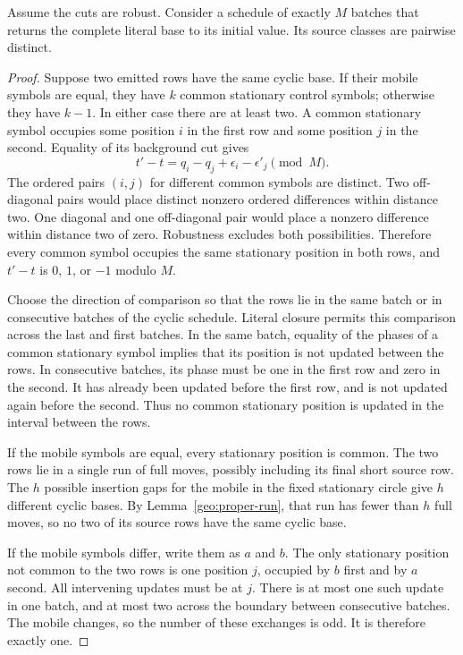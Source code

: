 \begin{lemma}
\label{geo:simplicity}
Assume the cuts are robust. Consider a schedule of exactly $M$ batches
that returns the complete literal base to its initial value. Its source
classes are pairwise distinct.
\end{lemma}
\begin{proof}
Suppose two emitted rows have the same cyclic base. If their mobile
symbols are equal, they have $k$ common stationary control symbols;
otherwise they have $k-1$. In either case there are at least two. A common
stationary symbol occupies some position $i$ in the first row and some
position $j$ in the second. Equality of its background cut gives
\[
 t'-t=q_i-q_j+\epsilon_i-\epsilon'_j\pmod M.
\]
The ordered pairs $(i,j)$ for different common symbols are distinct. Two
off-diagonal pairs would place distinct nonzero ordered differences within
distance two. One diagonal and one off-diagonal pair would place a
nonzero difference within distance two of zero. Robustness excludes both
possibilities. Therefore every common symbol occupies the same stationary
position in both rows, and $t'-t$ is $0$, $1$, or $-1$ modulo $M$.

Choose the direction of comparison so that the rows lie in the same batch
or in consecutive batches of the cyclic schedule. Literal closure permits
this comparison across the last and first batches. In the same batch,
equality of the phases of a common stationary symbol implies that its
position is not updated between the rows. In consecutive batches, its
phase must be one in the first row and zero in the second. It has already
been updated before the first row, and is not updated again before the
second. Thus no common stationary position is updated in the interval
between the rows.

If the mobile symbols are equal, every stationary position is common.
The two rows lie in a single run of full moves, possibly including its
final short source row. The $h$ possible insertion gaps for the mobile
in the fixed stationary circle give $h$ different cyclic bases. By
Lemma~\ref{geo:proper-run}, that run has fewer than $h$ full moves, so no
two of its source rows have the same cyclic base.

If the mobile symbols differ, write them as $a$ and $b$. The only
stationary position not common to the two rows is one position $j$,
occupied by $b$ first and by $a$ second. All intervening updates must be
at $j$. There is at most one such update in one batch, and at most two
across the boundary between consecutive batches. The mobile changes, so
the number of these exchanges is odd. It is therefore exactly one.


\end{proof}
